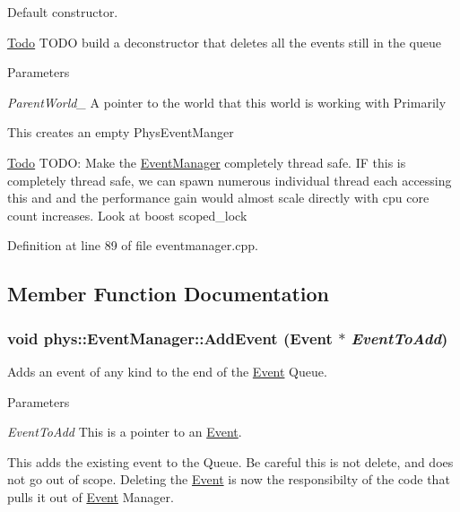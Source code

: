 Default constructor. 

\begin{Desc}
\item[\hyperlink{todo__todo000006}{Todo}]TODO build a deconstructor that deletes all the events still in the queue \end{Desc}

\begin{DoxyParams}{Parameters}
\item[{\em ParentWorld\_\-}]A pointer to the world that this world is working with Primarily\end{DoxyParams}
This creates an empty PhysEventManger

\begin{Desc}
\item[\hyperlink{todo__todo000002}{Todo}]TODO: Make the \hyperlink{classphys_1_1EventManager}{EventManager} completely thread safe. IF this is completely thread safe, we can spawn numerous individual thread each accessing this and and the performance gain would almost scale directly with cpu core count increases. Look at boost scoped\_\-lock \end{Desc}


Definition at line 89 of file eventmanager.cpp.



\subsection{Member Function Documentation}
\hypertarget{classphys_1_1EventManager_a563f30ac5390d398c99cf7dbfb722000}{
\subsubsection[{AddEvent}]{\setlength{\rightskip}{0pt plus 5cm}void phys::EventManager::AddEvent ({\bf Event} $\ast$ {\em EventToAdd})}}
\label{da/dde/classphys_1_1EventManager_a563f30ac5390d398c99cf7dbfb722000}


Adds an event of any kind to the end of the \hyperlink{classphys_1_1Event}{Event} Queue. 


\begin{DoxyParams}{Parameters}
\item[{\em EventToAdd}]This is a pointer to an \hyperlink{classphys_1_1Event}{Event}.\end{DoxyParams}
This adds the existing event to the Queue. Be careful this is not delete, and does not go out of scope. Deleting the \hyperlink{classphys_1_1Event}{Event} is now the responsibilty of the code that pulls it out of \hyperlink{classphys_1_1Event}{Event} Manager. 


